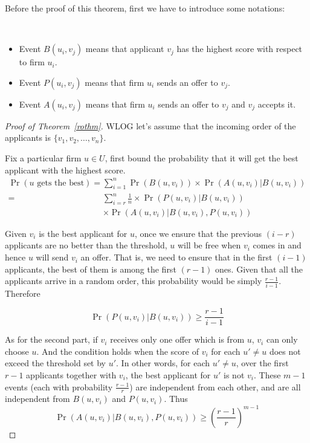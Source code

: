 Before the proof of this theorem, first we have to introduce some notations:
\begin{notation}\label{events}
    \ \\
\begin{itemize}
    \item Event $B(u_i, v_j)$ means that applicant $v_j$
        has the highest score with respect to firm $u_i$.
    \item Event $P(u_i, v_j)$ means that firm $u_i$ sends
        an offer to $v_j$.
    \item Event $A(u_i, v_j)$ means that firm $u_i$ sends
        an offer to $v_j$ and $v_j$ accepts it.
\end{itemize}

\end{notation}
\begin{proof}[Proof of Theorem~\ref{rothm}]
    WLOG let's assume that the incoming order of the applicants is
    $\{v_1, v_2, \dots, v_n\}$.

    Fix a particular firm $u \in U$,
    first bound the probability that it will get the best applicant
    with the highest score.
    \begin{align*}
        \Pr(u\text{ gets the best}) = &\sum_{i=1}^{n} \Pr(B(u, v_i)) \times \Pr(A(u, v_i)|B(u, v_i)) \\
                                = &\sum_{i=r}^{n} \frac{1}{n} \times \Pr(P(u, v_i)|B(u, v_i)) \\
                        & \times \Pr(A(u, v_i)|B(u, v_i),P(u, v_i))
    \end{align*}

    Given $v_i$ is the best applicant for $u$,
    once we ensure that the previous $(i-r)$ applicants are
    no better than the threshold, $u$ will be free when $v_i$ comes in
    and hence $u$ will send $v_i$ an offer.
    That is, we need to ensure that in the first $(i-1)$ applicants,
    the best of them is among the first $(r-1)$ ones.
    Given that all the applicants arrive in a random order,
    this probability would be simply $\frac{r-1}{i-1}$.
    Therefore

    $$\Pr(P(u, v_i) | B(u, v_i)) \ge \frac{r-1}{i-1}$$



    As for the second part,
    if $v_i$ receives only one offer which is from $u$,
    $v_i$ can only choose $u$.
    And the condition holds when the score of $v_i$
    for each $u' \neq u$ does not exceed the threshold set by $u'$.
    In other words, for each $u' \neq u$, over the first $r-1$ applicants together with $v_i$,
    the best applicant for $u'$ is not $v_i$.
    These $m-1$ events (each with probability $\frac{r-1}{r}$) are independent from each other,
    and are all independent from $B(u, v_i)$ and $P(u, v_i)$.
    Thus
    $$\Pr(A(u, v_i)|B(u, v_i), P(u, v_i)) \ge (\frac{r-1}{r})^{m-1}$$


\end{proof}
